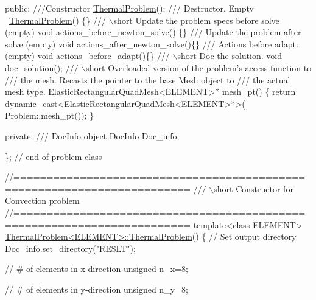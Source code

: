 \begin{DoxyCodeInclude}
\textcolor{keyword}{public}:
\textcolor{comment}{}
\textcolor{comment}{ ///Constructor}
\textcolor{comment}{} \hyperlink{classThermalProblem}{ThermalProblem}();
\textcolor{comment}{}
\textcolor{comment}{ /// Destructor. Empty}
\textcolor{comment}{} ~\hyperlink{classThermalProblem}{ThermalProblem}() \{\}
\textcolor{comment}{}
\textcolor{comment}{ /// \(\backslash\)short Update the problem specs before solve (empty)}
\textcolor{comment}{} \textcolor{keywordtype}{void} actions\_before\_newton\_solve() \{\}
\textcolor{comment}{}
\textcolor{comment}{ /// Update the problem after solve (empty)}
\textcolor{comment}{} \textcolor{keywordtype}{void} actions\_after\_newton\_solve()\{\}
\textcolor{comment}{}
\textcolor{comment}{ /// Actions before adapt:(empty)}
\textcolor{comment}{} \textcolor{keywordtype}{void} actions\_before\_adapt()\{\}
 \textcolor{comment}{}
\textcolor{comment}{ /// \(\backslash\)short Doc the solution.}
\textcolor{comment}{} \textcolor{keywordtype}{void} doc\_solution();
\textcolor{comment}{}
\textcolor{comment}{ /// \(\backslash\)short Overloaded version of the problem's access function to }
\textcolor{comment}{ /// the mesh. Recasts the pointer to the base Mesh object to }
\textcolor{comment}{ /// the actual mesh type.}
\textcolor{comment}{} ElasticRectangularQuadMesh<ELEMENT>* mesh\_pt() 
  \{
   \textcolor{keywordflow}{return} \textcolor{keyword}{dynamic\_cast<}ElasticRectangularQuadMesh<ELEMENT>*\textcolor{keyword}{>}(
    Problem::mesh\_pt());
  \}
 
\textcolor{keyword}{private}:
 \textcolor{comment}{}
\textcolor{comment}{ /// DocInfo object}
\textcolor{comment}{} DocInfo Doc\_info;

\}; \textcolor{comment}{// end of problem class}

\textcolor{comment}{//========================================================================}\textcolor{comment}{}
\textcolor{comment}{/// \(\backslash\)short Constructor for Convection problem}
\textcolor{comment}{}\textcolor{comment}{//========================================================================}
\textcolor{keyword}{template}<\textcolor{keyword}{class} ELEMENT>
\hyperlink{classThermalProblem_a12ad5d383929b1ef4ed29503c5a271b0}{ThermalProblem<ELEMENT>::ThermalProblem}()
\{
 \textcolor{comment}{// Set output directory}
 Doc\_info.set\_directory(\textcolor{stringliteral}{"RESLT"});
 
 \textcolor{comment}{// # of elements in x-direction}
 \textcolor{keywordtype}{unsigned} n\_x=8;

 \textcolor{comment}{// # of elements in y-direction}
 \textcolor{keywordtype}{unsigned} n\_y=8;
 

\end{DoxyCodeInclude}
